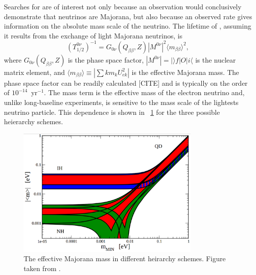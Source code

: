 Searches for \zvbb are of interest not only because an observation would conclusively demonstrate that neutrinos are Majorana, but also because an observed rate gives information on the absolute mass scale of the neutrino.  The lifetime of \zvbb, assuming it results from the exchange of light Majorana neutrinos, is 
\begin{equation}
(T^{0\nu}_{1/2})^{-1} = G_{0\nu}(Q_{\beta\beta},Z)|M^{0\nu}|^2 {\langle}m_{\beta\beta}{\rangle}^2,
\end{equation}
where $G_{0\nu}(Q_{\beta\beta},Z)$ is the phase space factor, $|M^{0\nu}| = |{\rangle}f|O|i{\langle}$ is the nuclear matrix element, and ${\langle}m_{\beta\beta}{\rangle} \equiv |\sum{k}m_k U_{ek}^2|$ is the effective Majorana mass.  The phase space factor can be readily calculated [CITE] and is typically on the order of $10^{-14}$~yr$^{-1}$.  The mass term is the effective mass of the electron neutrino and, unlike long-baseline experiments, is sensitive to the mass scale of the lightests neutrino particle.  This dependence is shown in {\fig}~\ref{fig:effectiveMajoranaMass} for the three possible heierarchy schemes.  
\begin{figure}[htp]
\centering
\includegraphics[width=0.8\textwidth]{figures/effectiveMajoranaMass.eps}
\caption{The effective Majorana mass in different heirarchy schemes.  Figure taken from \cite{PDG}.}
\label{fig:effectiveMajoranaMass}
\end{figure}

